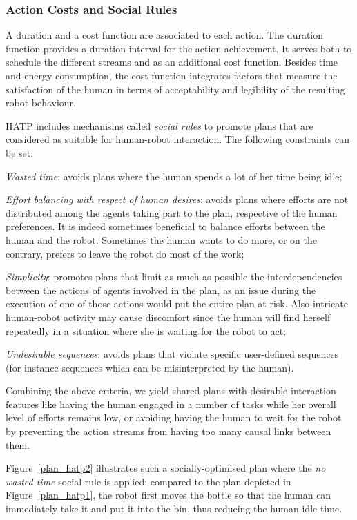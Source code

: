\documentclass[preprint,3p,times]{elsarticle}
\begin{document}
\subsubsection{Action Costs and Social Rules}

A duration and a cost function are associated to each action. The duration
function provides a duration interval for the action achievement. It serves both
to schedule the different streams and as an additional cost function. Besides
time and energy consumption, the cost function integrates factors that measure
the satisfaction of the human in terms of acceptability and legibility of the
resulting robot behaviour.

HATP includes mechanisms called \emph{social rules} to promote plans that are
considered as suitable for human-robot interaction. The following constraints
can be set:

\emph{Wasted time}: avoids plans where the human spends a lot
of her time being idle;

\emph{Effort balancing with respect of human desires}: avoids plans where efforts are
not distributed among the agents taking part to the plan, respective of the human preferences.  It is
indeed sometimes beneficial to balance efforts between the human and
the robot. Sometimes the human wants to do more, or on the contrary, prefers to leave the 
robot do most of the work;

\emph{Simplicity}: promotes plans that limit as much as possible the interdependencies
between the actions of agents involved in the plan, as an issue during the
execution of one of those actions would put the entire plan at risk. Also intricate human-robot activity may cause discomfort since
the human will find herself repeatedly in a situation where she is
waiting for the robot to act;

\emph{Undesirable sequences}: avoids plans that violate specific user-defined
sequences (for instance sequences which can be misinterpreted by the human).

Combining the above criteria, we yield shared plans with desirable
interaction features like having the human engaged in a number of tasks
while her overall level of efforts remains low, or avoiding having the
human to wait for the robot by preventing the action streams from
having too many causal links between them.

Figure~\ref{plan_hatp2} illustrates such a socially-optimised plan where the
\emph{no wasted time} social rule is applied: compared to the plan depicted in
Figure~\ref{plan_hatp1}, the robot first moves the bottle so that the human can
immediately take it and put it into the bin, thus reducing the human idle time.
\end{document}
